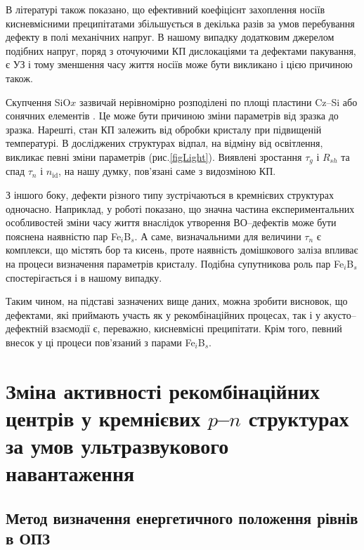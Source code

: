В літературі \cite{MurphyJAP2011} також показано, що ефективний коефіцієнт захоплення носіїв кисневмісними
преципітатами збільшується в декілька разів за умов перебування дефекту в полі механічних напруг.
В нашому випадку додатковим джерелом подібних напруг, поряд
з оточуючими КП дислокаціями та дефектами пакування, є УЗ і тому зменшення
часу життя носіїв може бути викликано і цією причиною також.

Скупчення SiO$x$ зазвичай нерівномірно розподілені по площі пластини  Cz--Si \cite{Oxide_Schon} або сонячних елементів \cite{Oxide:Chen}.
Це може бути причиною зміни параметрів від зразка до зразка.
Нарешті,  стан КП залежить від обробки кристалу при підвищеній температурі.
В досліджених структурах відпал, на відміну від освітлення, викликає певні зміни параметрів (рис.\ref{figLight}).
Виявлені зростання $\tau_g$ і $R_{sh}$ та спад $\tau_n$ і $n_\mathrm{id}$, на нашу думку, пов'язані саме з видозміною КП.

З іншого боку, дефекти різного типу зустрічаються в кремнієвих структурах одночасно.
Наприклад, у роботі \cite{BO:Fe} показано, що значна частина експериментальних особливостей зміни часу життя
внаслідок утворення ВО--дефектів може бути пояснена наявністю
пар  Fe$_i$B$_s$.
А саме, визначальними для величини $\tau_n$ є комплекси, що містять бор та кисень, проте
наявність домішкового заліза впливає на процеси визначення параметрів кристалу.
Подібна супутникова роль пар Fe$_i$B$_s$ спостерігається і в нашому випадку.

Таким чином, на підставі зазначених вище даних, можна зробити висновок,
що дефектами, які приймають участь як у рекомбінаційних процесах, так і у акусто--дефектній взаємодії є, переважно,
кисневмісні преципітати.
Крім того, певний внесок у ці процеси пов'язаний з парами Fe$_i$B$_s$.

\section{Зміна активності рекомбінаційних центрів у кремнієвих $p$--$n$ структурах за умов ультразвукового навантаження\label{sBulyrMethod}}

\subsection{Метод визначення енергетичного положення рівнів в ОПЗ}

